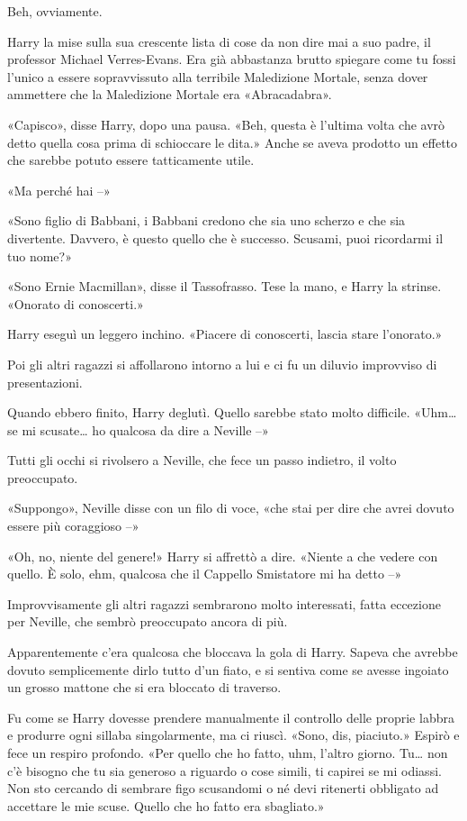 Beh, ovviamente.

Harry la mise sulla sua crescente lista di cose da non dire mai a suo padre, il professor Michael Verres-Evans. Era già abbastanza brutto spiegare come tu fossi l’unico a essere sopravvissuto alla terribile Maledizione Mortale, senza dover ammettere che la Maledizione Mortale era «Abracadabra».

«Capisco», disse Harry, dopo una pausa. «Beh, questa è l’ultima volta che avrò detto quella cosa prima di schioccare le dita.» Anche se aveva prodotto un effetto che sarebbe potuto essere tatticamente utile.

«Ma perché hai –»

«Sono figlio di Babbani, i Babbani credono che sia uno scherzo e che sia divertente. Davvero, è questo quello che è successo. Scusami, puoi ricordarmi il tuo nome?»

«Sono Ernie Macmillan», disse il Tassofrasso. Tese la mano, e Harry la strinse. «Onorato di conoscerti.»

Harry eseguì un leggero inchino. «Piacere di conoscerti, lascia stare l’onorato.»

Poi gli altri ragazzi si affollarono intorno a lui e ci fu un diluvio improvviso di presentazioni.

Quando ebbero finito, Harry deglutì. Quello sarebbe stato molto difficile. «Uhm… se mi scusate… ho qualcosa da dire a Neville –»

Tutti gli occhi si rivolsero a Neville, che fece un passo indietro, il volto preoccupato.

«Suppongo», Neville disse con un filo di voce, «che stai per dire che avrei dovuto essere più coraggioso –»

«Oh, no, niente del genere!» Harry si affrettò a dire. «Niente a che vedere con quello. È solo, ehm, qualcosa che il Cappello Smistatore mi ha detto –»

Improvvisamente gli altri ragazzi sembrarono molto interessati, fatta eccezione per Neville, che sembrò preoccupato ancora di più.

Apparentemente c’era qualcosa che bloccava la gola di Harry. Sapeva che avrebbe dovuto semplicemente dirlo tutto d’un fiato, e si sentiva come se avesse ingoiato un grosso mattone che si era bloccato di traverso.

Fu come se Harry dovesse prendere manualmente il controllo delle proprie labbra e produrre ogni sillaba singolarmente, ma ci riuscì. «Sono, dis, piaciuto.» Espirò e fece un respiro profondo. «Per quello che ho fatto, uhm, l’altro giorno. Tu… non c’è bisogno che tu sia generoso a riguardo o cose simili, ti capirei se mi odiassi. Non sto cercando di sembrare figo scusandomi o né devi ritenerti obbligato ad accettare le mie scuse. Quello che ho fatto era sbagliato.»

